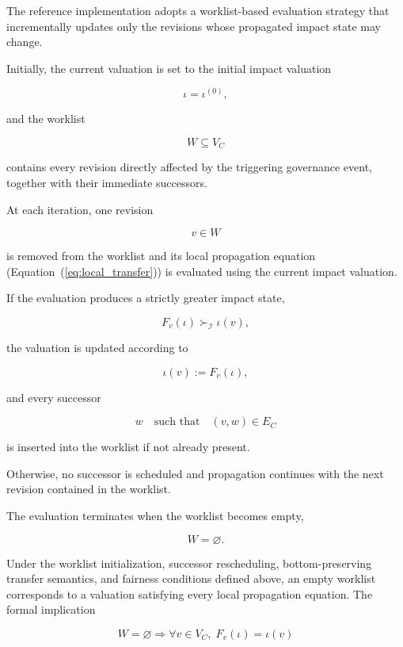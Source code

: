 \documentclass[10pt]{article}
\begin{document}
The reference implementation adopts a worklist-based evaluation strategy that incrementally updates only the revisions whose propagated impact state may change.

Initially, the current valuation is set to the initial impact valuation

\[
\iota
=
\iota^{(0)},
\]

and the worklist

\[
W
\subseteq
V_C
\]

contains every revision directly affected by the triggering governance event, together with their immediate successors.

At each iteration, one revision

\[
v\in W
\]

is removed from the worklist and its local propagation equation
(Equation~(\ref{eq:local_transfer})) is evaluated using the current impact valuation.

If the evaluation produces a strictly greater impact state,

\begin{equation}
	\label{eq:worklist_update}
	F_v(\iota)
	\succ_{\mathcal I}
	\iota(v),
\end{equation}

the valuation is updated according to

\begin{equation}
	\label{eq:worklist_assignment}
	\iota(v)
	:=
	F_v(\iota),
\end{equation}

and every successor

\[
w
\quad
\text{such that}
\quad
(v,w)\in E_C
\]

is inserted into the worklist if not already present.

Otherwise, no successor is scheduled and propagation continues with the next revision contained in the worklist.

The evaluation terminates when the worklist becomes empty,

\begin{equation}
	\label{eq:worklist_stop}
	W
	=
	\varnothing.
\end{equation}

Under the worklist initialization, successor rescheduling, bottom-preserving transfer semantics, and fairness conditions defined above, an empty worklist corresponds to a valuation satisfying every local propagation equation. The formal implication

\begin{equation}
	W
	=
	\varnothing
	\Longrightarrow
	\forall v\in V_C,\;
	F_v(\iota)
	=
	\iota(v)
	\label{eq:worklist_local_equilibrium}
\end{equation}
\end{document}
